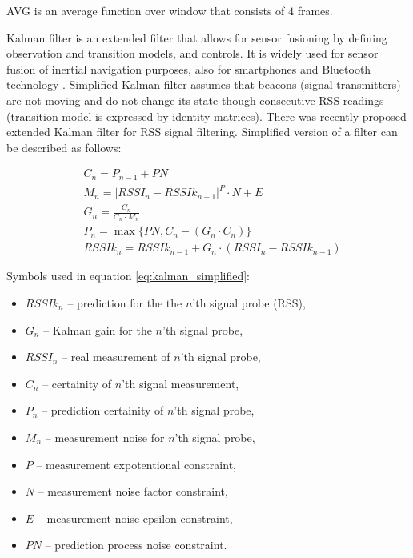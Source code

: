 \documentclass[../main.tex]{subfiles}
\begin{document}
AVG is an average function over window that consists of $4$ frames.

Kalman filter is an extended filter that allows for sensor fusioning by defining observation and transition models, and controls. It is widely used for sensor fusion of inertial navigation purposes\cite{inertial_navi_velocity_model}, also for smartphones \cite{inertial_navi_bike}\cite{indoor_navi_for_android}\cite{thesis_smartphone_inertial_plus_rfid} and Bluetooth technology \cite{beacon_rssi_analysis}\cite{discover_beacons_and_position}\cite{article_indoor_ble_rssi_filtering}\cite{article_inertial_active_beacons_calculus_kalman}. Simplified Kalman filter assumes that beacons (signal transmitters) are not moving and do not change its state though consecutive RSS readings (transition model is expressed by identity matrices). There was recently proposed extended Kalman filter for RSS signal filtering\cite{article_rss_kalman}. Simplified version of a filter can be described as follows:

\begin{equation}
\label{eq:kalman_simplified}
\begin{aligned}
& C_n = P_{n-1} + PN	\\
& M_n = |RSSI_n-RSSIk_{n-1}|^P \cdot N + E	\\
& G_n = \frac{C_n}{C_n \cdot M_n}	\\
& P_n = \max\{PN, C_n - (G_n \cdot C_n)\}	\\
& RSSIk_n = RSSIk_{n-1} + G_n \cdot (RSSI_n -  RSSIk_{n-1})
\end{aligned}
\end{equation}

Symbols used in equation \ref{eq:kalman_simplified}:
\begin{itemize}
	\item $RSSIk_n$ -- prediction for the the $n$'th signal probe (RSS),
	\item $G_n$ -- Kalman gain for the $n$'th signal probe,
	\item $RSSI_n$ -- real measurement of $n$'th signal probe,
	\item $C_n$ -- certainity of $n$'th signal measurement,
	\item $P_n$ -- prediction certainity of $n$'th signal probe,
	\item $M_n$ -- measurement noise for $n$'th signal probe,
	\item $P$ -- measurement expotentional constraint,
	\item $N$ -- measurement noise factor constraint,
	\item $E$ -- measurement noise epsilon constraint,
	\item $PN$ -- prediction process noise constraint.
\end{itemize}
\end{document}
